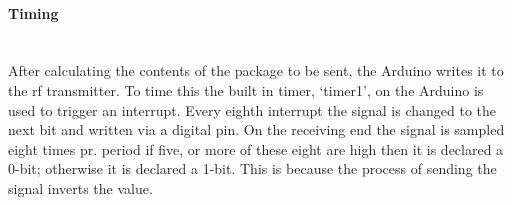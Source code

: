 \paragraph{Timing} \hfill \\
After calculating the contents of the package to be sent, the Arduino writes it to the \gls{rf} transmitter. 
To time this the built in timer, \enquote*{timer1}, on the Arduino is used to trigger an interrupt.
Every eighth interrupt the signal is changed to the next bit and written via a digital pin. 
On the receiving end the signal is sampled eight times pr. period if five, or more of these eight are high then it is declared a 0-bit; otherwise it is declared a 1-bit. %
This is because the process of sending the signal inverts the value.
